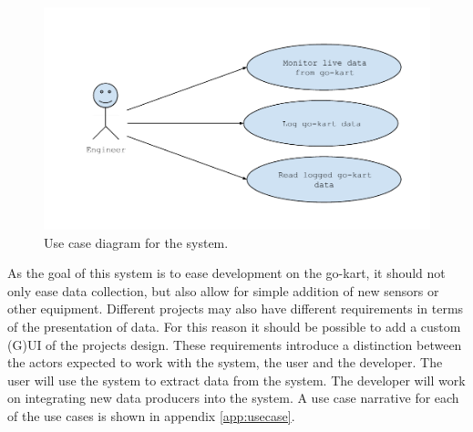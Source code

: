\begin{figure}[h]
 	\centering
    \includegraphics[width=1\textwidth]{graphics/use_cases}
    \caption{Use case diagram for the system.}
    \label{fig:usecases}
\end{figure}

As the goal of this system is to ease development on the go-kart, it should not only ease data collection, but also allow for simple addition of new sensors or other equipment.
Different projects may also have different requirements in terms of the presentation of data.
For this reason it should be possible to add a custom (G)UI of the projects design.
These requirements introduce a distinction between the actors expected to work with the system, the user and the developer.
The user will use the system to extract data from the system.
The developer will work on integrating new data producers into the system.
A use case narrative for each of the use cases is shown in appendix \ref{app:usecase}.